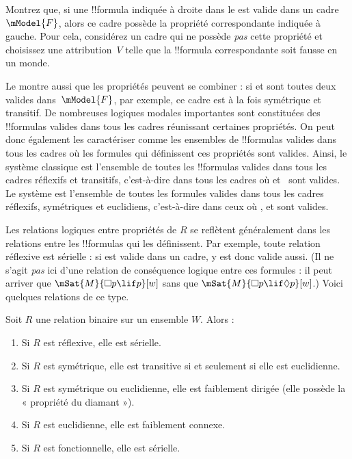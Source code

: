 \documentclass[../../../include/open-logic-section]{subfiles}
\begin{document}
\begin{prob}
Montrez que, si une !!{formula} indiquée à droite dans le
 est valide dans un
cadre~$\mModel{F}$, alors ce cadre possède la propriété
correspondante indiquée à gauche. Pour cela, considérez un
cadre qui ne possède \emph{pas} cette propriété et
choisissez une attribution~$V$ telle que la !!{formula}
correspondante soit fausse en un monde.
\end{prob}

Le  montre aussi que les propriétés
peuvent se combiner : si  et  sont toutes deux
valides dans~$\mModel{F}$, par exemple, ce cadre est à la fois
symétrique et transitif. De nombreuses logiques modales
importantes sont constituées des !!{formula}s valides dans tous
les cadres réunissant certaines propriétés. On peut donc
également les caractériser comme les ensembles de !!{formula}s
valides dans tous les cadres où les formules qui définissent
ces propriétés sont valides. Ainsi, le système classique
 est l'ensemble de toutes les !!{formula}s valides dans tous
les cadres réflexifs et transitifs, c'est-à-dire dans tous
les cadres où  et~ sont valides. Le système
 est l'ensemble de toutes les formules valides dans tous les
cadres réflexifs, symétriques et euclidiens, c'est-à-dire
dans ceux où ,  et  sont valides.

Les relations logiques entre propriétés de $R$ se reflètent
généralement dans les relations entre les !!{formula}s qui
les définissent. Par exemple, toute relation réflexive est
sérielle : si  est valide dans un cadre,  y est
donc valide aussi. (Il ne s'agit \emph{pas} ici d'une relation
de conséquence logique entre ces formules : il peut arriver que
$\mSat{M}{\Box p \lif p}[w]$ sans que
$\mSat{M}{\Box p \lif \Diamond p}[w]$.) Voici quelques
relations de ce type.

\begin{prop}
  Soit $R$ une relation binaire sur un ensemble $W$. Alors :
  \begin{enumerate}
  \item Si $R$ est réflexive, elle est sérielle.
  \item Si $R$ est symétrique, elle est transitive si et
    seulement si elle est euclidienne.
  \item Si $R$ est symétrique ou euclidienne, elle est
    faiblement dirigée (elle possède la « propriété du
    diamant »).
  \item Si $R$ est euclidienne, elle est faiblement connexe.
  \item Si $R$ est fonctionnelle, elle est sérielle.
  \end{enumerate}
\end{prop}
\end{document}
